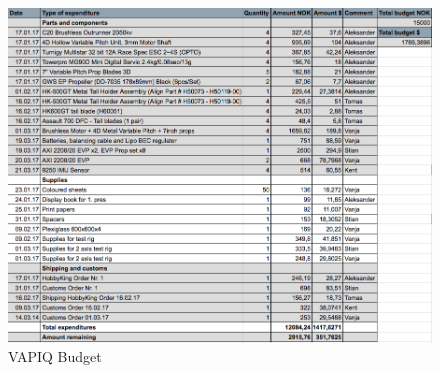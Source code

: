 \begin{figure}[H]
    \centering
    \includegraphics[width = 1.0\textwidth]{VAPIQ-PICTURES/budget1.png}
    \caption{VAPIQ Budget}
    \label{fig:budget}
\end{figure}
\\

\newpage
